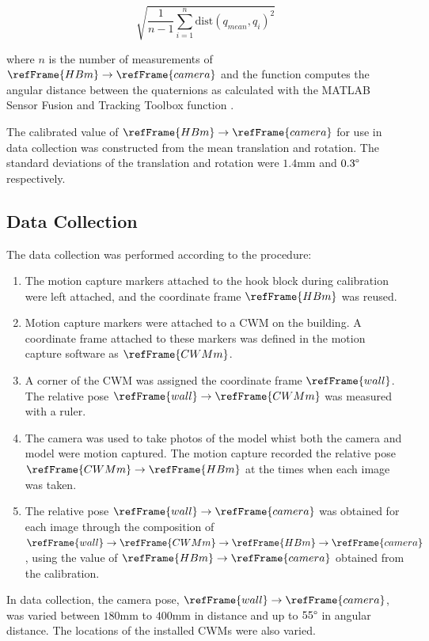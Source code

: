 \begin{equation}
    \sqrt{\frac{1}{n-1}\sum_{i=1}^{n}\text{dist}(q_{mean}, q_i)^2}
\end{equation}

where $n$ is the number of measurements of $\refFrame{HBm}\rightarrow\refFrame{camera}$ and the function  computes the angular distance between the quaternions as calculated with the MATLAB Sensor Fusion and Tracking Toolbox function .

The calibrated value of $\refFrame{HBm}\rightarrow\refFrame{camera}$ for use in data collection was constructed from the mean translation and rotation. The standard deviations of the translation and rotation were $1.4$mm and $0.3\degree$ respectively.


\subsection*{Data Collection}
The data collection was performed according to the procedure:
\begin{enumerate}
    \item The motion capture markers attached to the hook block during calibration were left attached, and the coordinate frame $\refFrame{HBm}$ was reused.
    \item Motion capture markers were attached to a CWM on the building. A coordinate frame attached to these markers was defined in the motion capture software as $\refFrame{CWMm}$.
    \item A corner of the CWM was assigned the coordinate frame $\refFrame{wall}$. The relative pose $\refFrame{wall}\rightarrow\refFrame{CWMm}$ was measured with a ruler.
    \item The camera was used to take photos of the model whist both the camera and model were motion captured. The motion capture recorded the relative pose $\refFrame{CWMm}\rightarrow\refFrame{HBm}$ at the times when each image was taken.
    \item The relative pose $\refFrame{wall}\rightarrow\refFrame{camera}$ was obtained for each image through the composition of $\refFrame{wall}\rightarrow\refFrame{CWMm}\rightarrow\refFrame{HBm}\rightarrow\refFrame{camera}$, using the value of $\refFrame{HBm}\rightarrow\refFrame{camera}$ obtained from the calibration.
\end{enumerate}

In data collection, the camera pose, $\refFrame{wall}\rightarrow\refFrame{camera}$, was varied between $180$mm to $400$mm in distance and up to $55\degree$ in angular distance. The locations of the installed CWMs were also varied.


